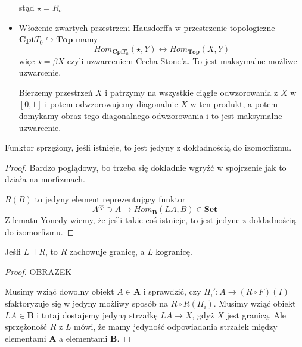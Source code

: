 \begin{example}
\begin{itemize}
      \begin{center}\end{center}
  
      stąd $\star=R_o$
    \item Włożenie zwartych przestrzeni Hausdorffa w przestrzenie topologiczne $\mathbf{Cpt}T_0\hookrightarrow \mathbf{Top}$ mamy
      $$Hom_{\mathbf{Cpf}T_0}(\star, Y)\longleftrightarrow Hom_{\mathbf{Top}}(X,Y)$$
      więc $\star=\beta X$ czyli uzwarceniem Cecha-Stone'a. To jest maksymalne możliwe uzwarcenie. 
  
      Bierzemy przestrzeń $X$ i patrzymy na wszystkie ciągłe odwzorowania z $X$ w $[0,1]$ i potem odwzorowujemy diagonalnie $X$ w ten produkt, a potem domykamy obraz tego diagonalnego odwzorowania i to jest maksymalne uzwarcenie.
  \end{itemize}
\end{example}

\begin{fact}
  Funktor sprzężony, jeśli istnieje, to jest jedyny z dokładnością do izomorfizmu.
\end{fact}

\begin{proof}
  Bardzo poglądowy, bo trzeba się dokładnie wgryźć w spojrzenie jak to działa na morfizmach.

  $R(B)$ to jedyny element reprezentujący funktor
  $$A^{op}\ni A\mapsto Hom_{\mathbf{B}}(LA,B)\in\mathbf{Set}$$
    Z lematu Yonedy wiemy, że jeśli takie coś istnieje, to jest jedyne z dokładnością do izomorfizmu.
\end{proof}

\begin{fact}\label{funktory sprzezone zachowuja granice}
  Jeśli $L\dashv R$, to $R$ zachowuje granicę, a $L$ kogranicę.
\end{fact}

\begin{proof}
  {\large\color{red}OBRAZEK}

  Musimy wziąć dowolny obiekt $A\in \mathbf{A}$ i sprawdzić, czy $\Pi_i':A\to (R\circ F)(I)$ sfaktoryzuje się w jedyny możliwy sposób na $R\circ R(\Pi_i)$. Musimy wziąć obiekt $LA\in\mathbf{B}$ i tutaj dostajemy jedyną strzałkę $LA\to X$, gdyż $X$ jest granicą. Ale sprzężoność $R$ z $L$ mówi, że mamy jedyność odpowiadania strzałek między elementami $\mathbf{A}$ a elementami $\mathbf{B}$.
\end{proof}

